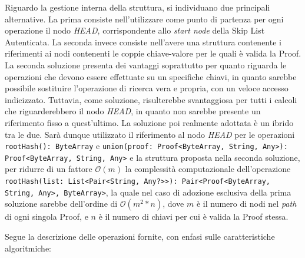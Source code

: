 		Riguardo la gestione interna della struttura, si individuano due principali alternative. La prima consiste nell'utilizzare come punto di partenza per ogni operazione il nodo \textit{HEAD}, corrispondente allo \textit{start node} della Skip List Autenticata. La seconda invece consiste nell'avere una struttura contenente i riferimenti ai nodi contenenti le coppie chiave-valore per le quali è valida la Proof. La seconda soluzione presenta dei vantaggi soprattutto per quanto riguarda le operazioni che devono essere effettuate su un specifiche chiavi, in quanto sarebbe possibile sostituire l'operazione di ricerca vera e propria, con un veloce accesso indicizzato. Tuttavia, come soluzione, risulterebbe svantaggiosa per tutti i calcoli che riguarderebbero il nodo \textit{HEAD}, in quanto non sarebbe presente un riferimento fisso a quest'ultimo. La soluzione poi realmente adottata è un ibrido tra le due. Sarà dunque utilizzato il riferimento al nodo \textit{HEAD} per le operazioni \verb!rootHash(): ByteArray! e \verb!union(proof: Proof<ByteArray, String, Any>): Proof<ByteArray, String, Any>! e la struttura proposta nella seconda soluzione, per ridurre di un fattore $\mathcal{O}(m)$ la complessità computazionale dell'operazione \verb!rootHash(list: List<Pair<String, Any?>>): Pair<Proof<ByteArray, String, Any>, ByteArray>!, la quale nel caso di adozione esclusiva della prima soluzione sarebbe dell'ordine di $\mathcal{O}(m^{2}*n)$, dove $ m $ è il numero di nodi nel \textit{path} di ogni singola Proof, e $ n $ è il numero di chiavi per cui è valida la Proof stessa.
		
						
		Segue la descrizione delle operazioni fornite, con enfasi sulle caratteristiche algoritmiche:
		
